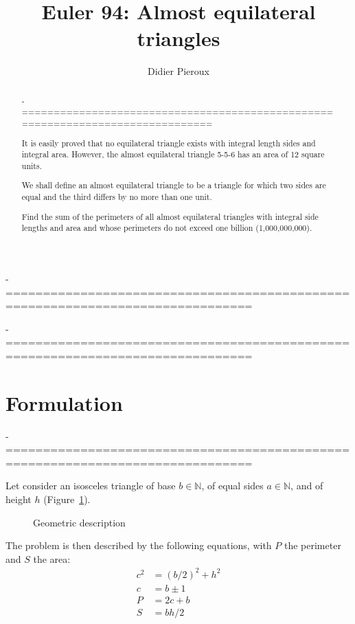 \documentclass[11pt, twoside, a4paper]{article}
\newcommand{\Figure}[1]{Figure~\ref{#1}}
\newcommand{\set}[1]{\mathbb{#1}}
\begin{document}
\title{Euler 94: Almost equilateral triangles}
\date{}
\author{Didier Pieroux}
\maketitle

-===============================================================================
\begin{abstract} 
-===============================================================================

It is easily proved that no equilateral triangle exists with integral length sides and integral area. However, the almost equilateral triangle 5-5-6 has an area of 12 square units.

We shall define an almost equilateral triangle to be a triangle for which two sides are equal and the third differs by no more than one unit.

Find the sum of the perimeters of all almost equilateral triangles with integral side lengths and area and whose perimeters do not exceed one billion (1,000,000,000).
\end{abstract}

-===============================================================================
\section{Formulation}
-===============================================================================

Let consider an isosceles triangle of base $b\in\set N$, of equal sides $a\in\set N$, and of height $h$ (\Figure{fig:triangle1}).
  
\begin{figure}[h]
    \begin{center}
        \caption{Geometric description}
        \label{fig:triangle1}
    \end{center}
\end{figure}

The problem is then described by the following equations, with $P$ the perimeter and $S$ the area:
\begin{align}
    c^2 & = (b/2)^2 + h^2 \\ \label{eq:pytha1}
    c & = b \pm 1 \\ \label{eq:ab}
    P & = 2c+b \\ 
    S & = bh/2 \\ \label{eq:S1}
\end{align} 
    
\end{document}
